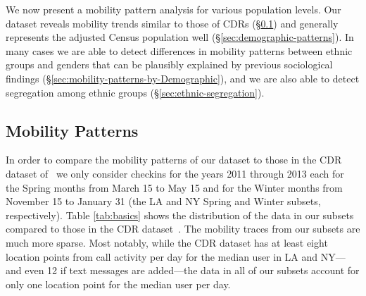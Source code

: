 We now present a mobility pattern analysis for various population levels. Our dataset reveals mobility trends similar to those of CDRs (\S\ref{sec:mobility-patterns}) and generally represents the adjusted Census population well (\S\ref{sec:demographic-patterns}). In many cases we are able to detect differences in mobility patterns between ethnic groups and genders that can be plausibly explained by previous sociological findings (\S\ref{sec:mobility-patterns-by-Demographic}), and we are also able to detect segregation among ethnic groups (\S\ref{sec:ethnic-segregation}).

\subsection{Mobility Patterns}
\label{sec:mobility-patterns}

In order to compare the mobility patterns of our dataset to those in the CDR dataset of~\cite{Isaacman:2011cn,Isaacman:2010en} we only consider checkins for the years 2011 through 2013 each for the Spring months from March 15 to May 15 and for the Winter months from November 15 to January 31 (the LA and NY Spring and Winter subsets, respectively). Table \ref{tab:basics} shows the distribution of the data in our subsets compared to those in the CDR dataset~\cite{Isaacman:2011cn}. The mobility traces from our subsets are much more sparse. Most notably, while the CDR dataset has at least eight location points from call activity per day for the median user in LA and NY---and even 12 if text messages are added---the data in all of our subsets account for only one location point for the median user per day.

